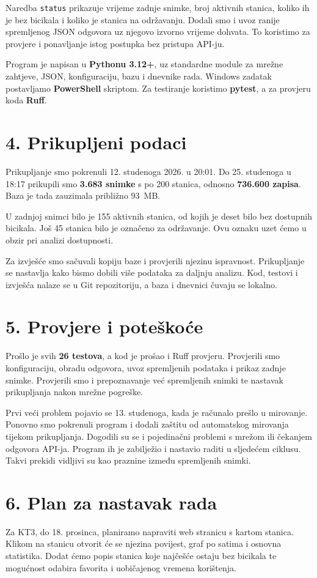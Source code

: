 \documentclass[a4paper,11pt]{article}
\begin{document}
Naredba \texttt{status} prikazuje vrijeme zadnje snimke, broj
aktivnih stanica, koliko ih je bez bicikala i koliko je stanica
na održavanju. Dodali smo i uvoz ranije spremljenog JSON odgovora
uz njegovo izvorno vrijeme dohvata. To koristimo za provjere i
ponavljanje istog postupka bez pristupa API-ju.

Program je napisan u \textbf{Pythonu 3.12+}, uz standardne module
za mrežne zahtjeve, JSON, konfiguraciju, bazu i dnevnike rada.
Windows zadatak postavljamo \textbf{PowerShell} skriptom.
Za testiranje koristimo \textbf{pytest}, a za provjeru koda
\textbf{Ruff}.

\newpage
\section*{4. Prikupljeni podaci}
Prikupljanje smo pokrenuli 12. studenoga 2026. u 20:01.
Do 25. studenoga u 18:17 prikupili smo \textbf{3.683 snimke}
s po 200 stanica, odnosno \textbf{736.600 zapisa}.
Baza je tada zauzimala približno 93~MB.

U zadnjoj snimci bilo je 155 aktivnih stanica, od kojih je deset
bilo bez dostupnih bicikala. Još 45 stanica bilo je označeno za
održavanje. Ovu oznaku uzet ćemo u obzir pri analizi dostupnosti.

Za izvješće smo sačuvali kopiju baze i provjerili njezinu
ispravnost. Prikupljanje se nastavlja kako bismo dobili više
podataka za daljnju analizu. Kod, testovi i izvješća nalaze se
u Git repozitoriju, a baza i dnevnici čuvaju se lokalno.

\section*{5. Provjere i poteškoće}
Prošlo je svih \textbf{26 testova}, a kod je prošao i Ruff provjeru.
Provjerili smo konfiguraciju, obradu odgovora, uvoz spremljenih
podataka i prikaz zadnje snimke. Provjerili smo i prepoznavanje
već spremljenih snimki te nastavak prikupljanja nakon mrežne
pogreške.

Prvi veći problem pojavio se 13. studenoga, kada je računalo
prešlo u mirovanje. Ponovno smo pokrenuli program i dodali
zaštitu od automatskog mirovanja tijekom prikupljanja.
Dogodili su se i pojedinačni problemi s mrežom ili čekanjem
odgovora API-ja. Program ih je zabilježio i nastavio raditi
u sljedećem ciklusu. Takvi prekidi vidljivi su kao praznine
između spremljenih snimki.

\section*{6. Plan za nastavak rada}
Za KT3, do 18. prosinca, planiramo napraviti web stranicu s
kartom stanica. Klikom na stanicu otvorit će se njezina povijest,
graf po satima i osnovna statistika. Dodat ćemo popis stanica
koje najčešće ostaju bez bicikala te mogućnost odabira favorita
i uobičajenog vremena korištenja.
\end{document}
